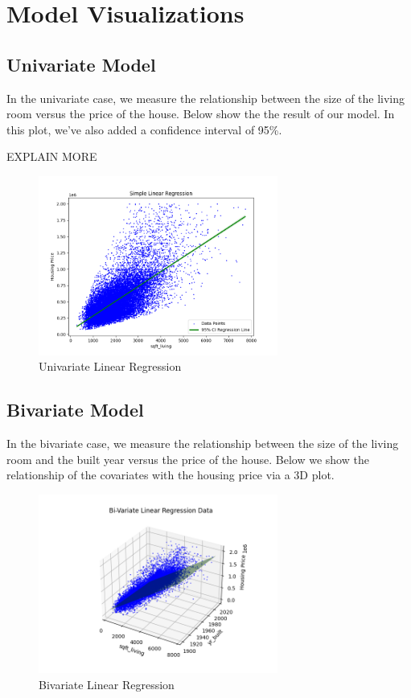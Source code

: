 \documentclass[11pt,a4paper]{article}
\begin{document}
\newpage
\section{Model Visualizations}

\subsection{Univariate Model}

In the univariate case, we measure the relationship between the size of the
living room versus the price of the house. Below show the the result of our
model. In this plot, we've also added a confidence interval of 95\%.

{\color{red}EXPLAIN MORE}

\begin{figure}[H]
    \centering
    \includegraphics*[width=0.7\textwidth]{simple_regression.png}
    \caption{Univariate Linear Regression}
    \label{fig: univariate}
\end{figure}

\subsection{Bivariate Model}
In the bivariate case, we measure the relationship between the size of the
living room and the built year versus the price of the house. Below we show the
relationship of the covariates with the housing price via a 3D plot.
\begin{figure}[H]
    \centering
    \includegraphics*[width=0.7\textwidth]{multi_data.png}
    \caption{Bivariate Linear Regression}
    \label{fig: bivariate}
\end{figure}
\end{document}
